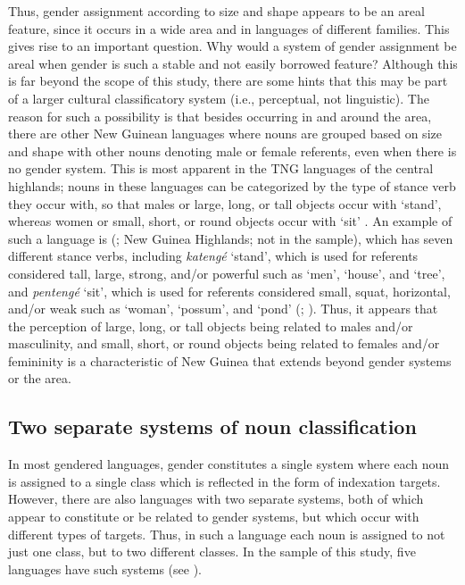 \documentclass[output=collectionpaper]{langsci/langscibook}
\begin{document}
Thus, gender assignment according to size and shape appears to be an areal feature, since it occurs in a wide area and in languages of different families. This gives rise to an important question. Why would a system of gender assignment be areal when gender is such a stable and not easily borrowed feature?  Although this is far beyond the scope of this study, there are some hints that this may be part of a larger cultural classificatory system (i.e., perceptual, not linguistic). The reason for such a possibility is that besides occurring in and around the  area, there are other New Guinean languages where nouns are grouped based on size and shape with other nouns denoting male or female referents, even when there is no gender system. This is most apparent in the TNG languages of the central highlands; nouns in these languages can be categorized by the type of stance verb they occur with, so that males or large, long, or tall objects occur with `stand', whereas women or small, short, or round objects occur with `sit'  \citep[372]{Foley2000}. An example of such a language is  (; New Guinea Highlands; not in the sample), which has seven different stance verbs, including \textit{katengé} `stand', which is used for referents considered tall, large, strong, and/or powerful such as `men', `house', and `tree', and \textit{pentengé} `sit', which is used for referents considered small, squat, horizontal, and/or weak such as `woman', `possum', and `pond' (\citealt[158--159]{Aikhenvald2000}; \citealt{Rumsey2002}). Thus, it appears that the perception of large, long, or tall objects being related to males and/or masculinity, and small, short, or round objects being related to females and/or femininity is a characteristic of New Guinea that extends beyond gender systems or the  area.


\subsection{ Two separate systems of noun classification}
\label{sec:Svard:5.2}

In most gendered languages, gender constitutes a single system where each noun is assigned to a single class which is reflected in the form of indexation targets. However, there are also languages with two separate systems, both of which appear to constitute or be related to gender systems, but which occur with different types of targets. Thus, in such a language each noun is assigned to not just one class, but to two different classes. In the sample of this study, five languages have such systems (see ).
\end{document}
